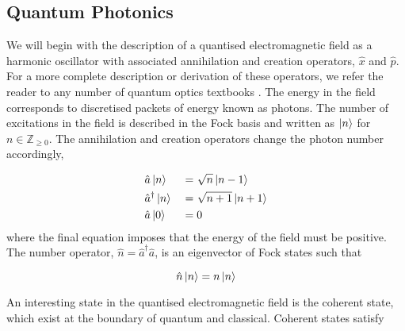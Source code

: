 %

\subsection{Quantum Photonics}

We will begin with the description of a quantised electromagnetic field as a harmonic oscillator with associated annihilation and creation operators, $\hat{x}$ and $\hat{p}$. For a more complete description or derivation of these operators, we refer the reader to any number of quantum optics textbooks \cite{gerry2005introductory, fox2006quantum, loudon2000quantum}. The energy in the field corresponds to discretised packets of energy known as photons. The number of excitations in the field is described in the Fock basis and written as $\ket{n}$ for $n\in \mathbb{Z}_{\ge 0}$. The annihilation and creation operators change the photon number accordingly,

\begin{alignat}{2}
	&\hat{a}\ket{n} &&= \sqrt{n}\ket{n-1}\\
	&\hat{a}^\dagger \ket{n} &&= \sqrt{n+1}\ket{n+1}\\
	&\hat{a}\ket{0} && = 0
\end{alignat}
where the final equation imposes that the energy of the field must be positive. The number operator, $\hat{n} = \hat{a}^\dagger\hat{a}$, is an eigenvector of Fock states such that

\begin{equation}
	\hat{n}\ket{n} = n\ket{n}
\end{equation}



An interesting state in the quantised electromagnetic field is the coherent state, which exist at the boundary of quantum and classical. Coherent states satisfy 

